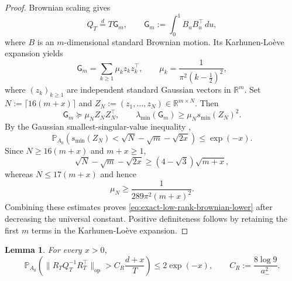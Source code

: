 \documentclass[11pt]{article}
\newtheorem{lemma}[theorem]{Lemma}
\begin{document}
\begin{proof}
Brownian scaling gives
\[
    Q_T\stackrel{d}{=}T\mathsf G_m,
    \qquad
    \mathsf G_m:=\int_0^1B_uB_u^\top\,du,
\]
where $B$ is an $m$-dimensional standard Brownian motion. Its
Karhunen-Lo\`eve expansion yields
\[
    \mathsf G_m=\sum_{k\geq1}\mu_kz_kz_k^\top,
    \qquad
    \mu_k=\frac{1}{\pi^2(k-\tfrac12)^2},
\]
where $(z_k)_{k\geq1}$ are independent standard Gaussian vectors in
$\mathbb R^m$. Set $N:=\lceil16(m+x)\rceil$ and
$Z_N:=(z_1,\ldots,z_N)\in\mathbb R^{m\times N}$. Then
\[
    \mathsf G_m\succeq\mu_NZ_NZ_N^\top,
    \qquad
    \lambda_{\min}(\mathsf G_m)\geq\mu_Ns_{\min}(Z_N)^2.
\]
By the Gaussian smallest-singular-value inequality
\cite[Theorem~2.13]{DavidsonSzarek2001},
\[
    \mathbb P_{A_0}\!\left(
        s_{\min}(Z_N)<\sqrt N-\sqrt m-\sqrt{2x}
    \right)
    \leq \exp(-x).
\]
Since $N\geq16(m+x)$ and $m+x\geq1$,
\[
    \sqrt N-\sqrt m-\sqrt{2x}
    \geq(4-\sqrt3)\sqrt{m+x},
\]
whereas $N\leq17(m+x)$ and hence
\[
    \mu_N\geq\frac{1}{289\pi^2(m+x)^2}.
\]
Combining these estimates proves
\eqref{eq:exact-low-rank-brownian-lower} after decreasing the universal
constant. Positive definiteness follows by retaining the first $m$ terms in the
Karhunen-Lo\`eve expansion.
\end{proof}

\begin{lemma}%
\label{lem:exact-low-rank-cross-block}
For every $x>0$,
\begin{equation}
    \mathbb P_{A_0}\!\left(
        \|R_TQ_T^{-1}R_T^\top\|_{\mathrm{op}}
        >C_R\frac{d+x}{T}
    \right)
    \leq2\exp(-x),
    \qquad
    C_R:=\frac{8\log9}{a_-^2}.
\label{eq:exact-low-rank-cross-bound}
\end{equation}
\end{lemma}
\end{document}
